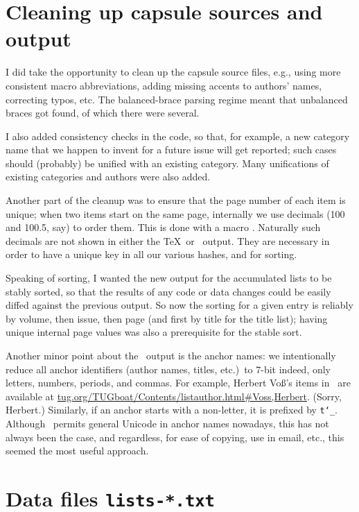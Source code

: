 \documentclass[final]{ltugboat}
\def\code#1{{\tt #1}}
\begin{document}
\section{Cleaning up capsule sources and output}

I did take the opportunity to clean up the capsule source files, e.g.,
using more consistent macro abbreviations, adding missing accents to
authors' names, correcting typos, etc. The balanced-brace parsing regime
meant that unbalanced braces got found, of which there were several.

I also added consistency checks in the code, so that, for example, a new
category name that we happen to invent for a future issue will get
reported; such cases should (probably) be unified with an existing
category. Many unifications of existing categories and authors were also
added.

Another part of the cleanup was to ensure that the page number of each
item is unique; when two items start on the same page, internally we use
decimals (100 and 100.5, say) to order them. This is done with a macro
. Naturally such decimals are not shown in either the \TeX\
or \HTML\ output. They are necessary in order to have a unique key in
all our various hashes, and for sorting.

Speaking of sorting, I wanted the new output for the accumulated lists
to be stably sorted, so that the results of any code or data changes
could be easily diffed against the previous output. So now the sorting
for a given entry is reliably by volume, then issue, then page (and
first by title for the title list); having unique internal page values
was also a prerequisite for the stable sort.

Another minor point about the \HTML\ output is the anchor names: we
intentionally reduce all anchor identifiers (author names, titles,
etc.)\ to 7-bit \ASCII\Dash indeed, only letters, numbers, periods, and
commas. For example, Herbert Vo\ss's
items in \TUB\ are available at
\url{tug.org/TUGboat/Contents/listauthor.html#Voss,Herbert}. (Sorry,
Herbert.) Similarly, if an anchor starts with a non-letter, it is
prefixed by \code{t\char`\_}. Although \HTML\ permits general Unicode in
anchor names nowadays, this has not always been the case, and
regardless, for ease of copying, use in email, etc., this seemed the
most useful approach.

\section{Data files \code{lists-*.txt}}
\end{document}
